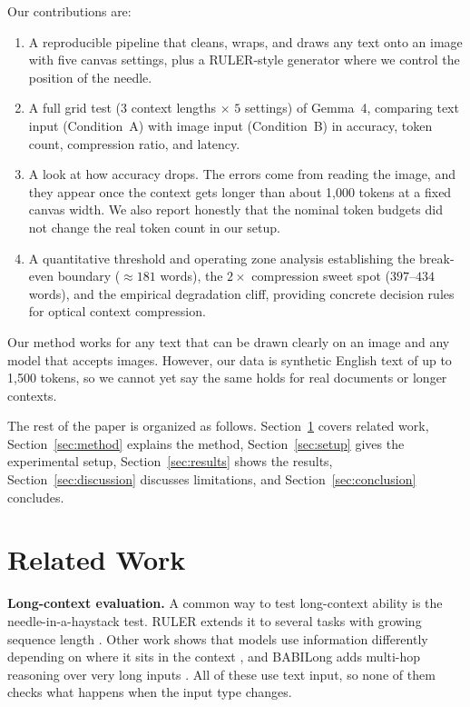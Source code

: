 \documentclass[conference]{IEEEtran}
\begin{document}
Our contributions are:
\begin{enumerate}
\item A reproducible pipeline that cleans, wraps, and draws any text onto an image with five canvas settings, plus a RULER-style generator where we control the position of the needle.
\item A full grid test ($3$ context lengths $\times$ $5$ settings) of Gemma~4, comparing text input (Condition~A) with image input (Condition~B) in accuracy, token count, compression ratio, and latency.
\item A look at how accuracy drops. The errors come from reading the image, and they appear once the context gets longer than about 1{,}000 tokens at a fixed canvas width. We also report honestly that the nominal token budgets did not change the real token count in our setup.
\item A quantitative threshold and operating zone analysis establishing the break-even boundary ($\approx 181$ words), the $2\times$ compression sweet spot ($397$--$434$ words), and the empirical degradation cliff, providing concrete decision rules for optical context compression.
\end{enumerate}

Our method works for any text that can be drawn clearly on an image and any model that accepts images. However, our data is synthetic English text of up to 1{,}500 tokens, so we cannot yet say the same holds for real documents or longer contexts.

The rest of the paper is organized as follows. Section~\ref{sec:related} covers related work, Section~\ref{sec:method} explains the method, Section~\ref{sec:setup} gives the experimental setup, Section~\ref{sec:results} shows the results, Section~\ref{sec:discussion} discusses limitations, and Section~\ref{sec:conclusion} concludes.

\section{Related Work}
\label{sec:related}
\textbf{Long-context evaluation.} A common way to test long-context ability is the needle-in-a-haystack test. RULER extends it to several tasks with growing sequence length \cite{hsieh2024ruler}. Other work shows that models use information differently depending on where it sits in the context \cite{liu2024lost}, and BABILong adds multi-hop reasoning over very long inputs \cite{kuratov2024babilong}. All of these use text input, so none of them checks what happens when the input type changes.
\end{document}
